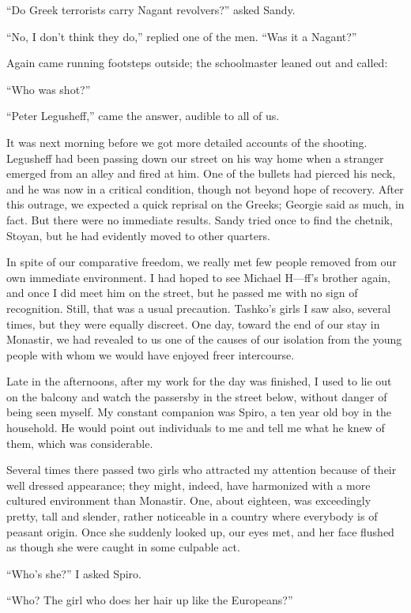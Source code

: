 \documentclass[a5paper,12pt]{book}
\begin{document}
“Do Greek terrorists carry Nagant revolvers?” asked Sandy.

“No, I don’t think they do,” replied one of the men. “Was it a Nagant?”

Again came running footsteps outside; the schoolmaster leaned out and called:

“Who was shot?”

“Peter Legusheff,” came the answer, audible to all of us.

It was next morning before we got more detailed accounts of the shooting. Legusheff had been passing down our street on his way home when a stranger emerged from an alley and fired at him. One of the bullets had pierced his neck, and he was now in a critical condition, though not beyond hope of recovery.
After this outrage, we expected a quick reprisal on the Greeks; Georgie said as much, in fact. But there were no immediate results. Sandy tried once to find the chetnik, Stoyan, but he had evidently moved to other quarters. 

In spite of our comparative freedom, we really met few people removed from our own immediate environment. I had hoped to see Michael H—ff’s brother again, and once I did meet him on the street, but he passed me with no sign of recognition. Still, that was a usual precaution. Tashko’s girls I saw also, several times, but they were equally discreet. One day, toward the end of our stay in Monastir, we had revealed to us one of the causes of our isolation from the young people with whom we would have enjoyed freer intercourse. 

Late in the afternoons, after my work for the day was finished, I used to lie out on the balcony and watch the passersby in the street below, without danger of being seen myself. My constant companion was Spiro, a ten year old boy in the household. He would point out individuals to me and tell me what he knew of them, which was considerable. 

Several times there passed two girls who attracted my attention because of their well dressed appearance; they might, indeed, have harmonized with a more cultured environment than Monastir. One, about eighteen, was exceedingly pretty, tall and slender, rather noticeable in a country where everybody is of peasant origin. Once she suddenly looked up, our eyes met, and her face flushed as though she were caught in some culpable act. 

“Who's she?” I asked Spiro. 

“Who? The girl who does her hair up like the Europeans?”
\end{document}
